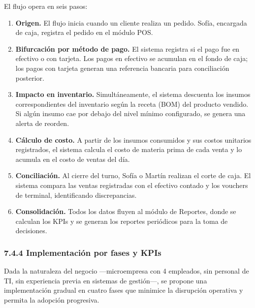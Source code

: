 \documentclass[
  12pt,
  spanish,
]{article}
\providecommand{\tightlist}{%
  \setlength{\itemsep}{0pt}\setlength{\parskip}{0pt}}
\begin{document}
El flujo opera en seis pasos:

\begin{enumerate}
\def\labelenumi{\arabic{enumi}.}
\tightlist
\item
  \textbf{Origen.} El flujo inicia cuando un cliente realiza un pedido.
  Sofía, encargada de caja, registra el pedido en el módulo POS.
\item
  \textbf{Bifurcación por método de pago.} El sistema registra si el
  pago fue en efectivo o con tarjeta. Los pagos en efectivo se acumulan
  en el fondo de caja; los pagos con tarjeta generan una referencia
  bancaria para conciliación posterior.
\item
  \textbf{Impacto en inventario.} Simultáneamente, el sistema descuenta
  los insumos correspondientes del inventario según la receta (BOM) del
  producto vendido. Si algún insumo cae por debajo del nivel mínimo
  configurado, se genera una alerta de reorden.
\item
  \textbf{Cálculo de costo.} A partir de los insumos consumidos y sus
  costos unitarios registrados, el sistema calcula el costo de materia
  prima de cada venta y lo acumula en el costo de ventas del día.
\item
  \textbf{Conciliación.} Al cierre del turno, Sofía o Martín realizan el
  corte de caja. El sistema compara las ventas registradas con el
  efectivo contado y los vouchers de terminal, identificando
  discrepancias.
\item
  \textbf{Consolidación.} Todos los datos fluyen al módulo de Reportes,
  donde se calculan los KPIs y se generan los reportes periódicos para
  la toma de decisiones.
\end{enumerate}

\hypertarget{implementaciuxf3n-por-fases-y-kpis}{%
\subsubsection{7.4.4 Implementación por fases y
KPIs}\label{implementaciuxf3n-por-fases-y-kpis}}

Dada la naturaleza del negocio ---microempresa con 4 empleados, sin
personal de TI, sin experiencia previa en sistemas de gestión---, se
propone una implementación gradual en cuatro fases que minimice la
disrupción operativa y permita la adopción progresiva.
\end{document}

